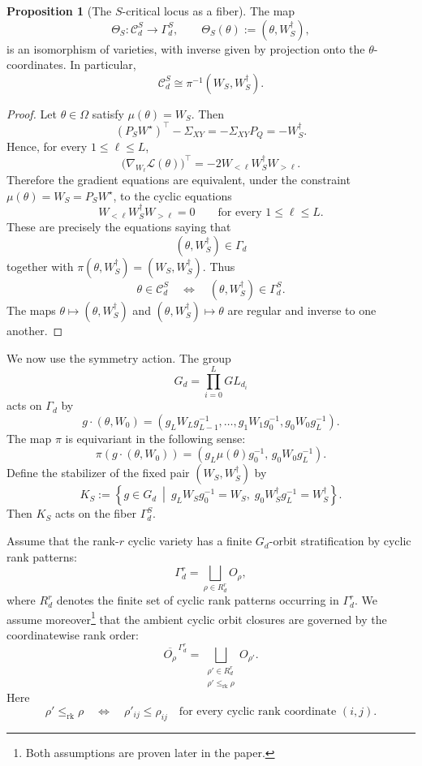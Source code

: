\documentclass[11pt]{article}
\theoremstyle{definition}
\newtheorem{proposition}[theorem]{Proposition}
\begin{document}
\begin{proposition}[The \(S\)-critical locus as a fiber]
\label{prop:S-critical-fiber}
The map
\[
\Theta_S:\mathcal C_d^S\longrightarrow \Gamma_d^S,
\qquad
\Theta_S(\theta):=(\theta,W_S^{\dagger}),
\]
is an isomorphism of varieties, with inverse given by projection onto the
\(\theta\)-coordinates. In particular,
\[
\mathcal C_d^S\cong \pi^{-1}(W_S, W_S^{\dagger}).
\]
\end{proposition}

\begin{proof}
Let \(\theta\in\Omega\) satisfy \(\mu(\theta)=W_S\). Then
\[
(P_S W^\star)^\top-\Sigma_{XY}
=
-\Sigma_{XY}P_Q =-W_S^{\dagger}.
\]
Hence, for every \(1\leq \ell\leq L\),
\[
\bigl(\nabla_{W_\ell}\mathcal L(\theta)\bigr)^\top
=
-2W_{<\ell}W_S^{\dagger}W_{>\ell}.
\]
Therefore the gradient equations are equivalent, under the constraint
\(\mu(\theta)=W_S=P_S W^{\star}\), to the cyclic equations
\[
W_{<\ell}W_S^{\dagger}W_{>\ell}=0
\qquad
\text{for every }1\leq \ell\leq L.
\]
These are precisely the equations saying that
\[
(\theta,W_S^{\dagger})\in \Gamma_d
\]
together with \(\pi(\theta,W_S^{\dagger})=(W_S,W_S^{\dagger})\). Thus
\[
\theta\in\mathcal C_d^S
\quad\Longleftrightarrow\quad
(\theta,W_S^{\dagger})\in\Gamma_d^S.
\]
The maps \(\theta\mapsto(\theta,W_S^{\dagger})\) and
\((\theta,W_S^{\dagger})\mapsto\theta\) are regular and inverse to one another.
\end{proof}

We now use the symmetry action. The group
\[
G_d=\prod_{i=0}^L GL_{d_i}
\]
acts on \(\Gamma_d\) by
\[
g\cdot(\theta,W_0)
=
(g_L W_Lg_{L-1}^{-1},\dots,g_1 W_1g_0^{-1},g_0 W_0g_L^{-1}).
\]
The map \(\pi\) is equivariant in the following sense:
\[
\pi(g\cdot(\theta,W_0))
=
(g_L\mu(\theta)g_0^{-1},\,g_0 W_0g_L^{-1}).
\]
Define the stabilizer of the fixed pair \((W_S,W_S^{\dagger})\) by
\[
K_S
:=
\left\{
g\in G_d
\ \middle|\
g_L W_Sg_0^{-1}=W_S,\;
g_0 W_S^{\dagger}g_L^{-1}=W_S^{\dagger}
\right\}.
\]
Then \(K_S\) acts on the fiber \(\Gamma_d^S\).

Assume that the rank-\(r\) cyclic variety has a finite
\(G_d\)-orbit stratification by cyclic rank patterns:
\[
\Gamma_d^r
=
\bigsqcup_{\rho\in R_d^r} O_\rho,
\]
where \(R_d^r\) denotes the finite set of cyclic rank patterns occurring in
\(\Gamma_d^r\). We assume moreover\footnote{Both assumptions are proven later in the paper.} that the ambient cyclic orbit closures are
governed by the coordinatewise rank order:
\[
\overline{O_\rho}^{\,\Gamma_d^r}
=
\bigsqcup_{\substack{\rho'\in R_d^r\\ \rho'\leq_{\mathrm{rk}}\rho}}
O_{\rho'}.
\]
Here
\[
\rho'\leq_{\mathrm{rk}}\rho
\quad\Longleftrightarrow\quad
\rho'_{ij}\leq \rho_{ij}
\quad
\text{for every cyclic rank coordinate }(i,j).
\]
\end{document}
